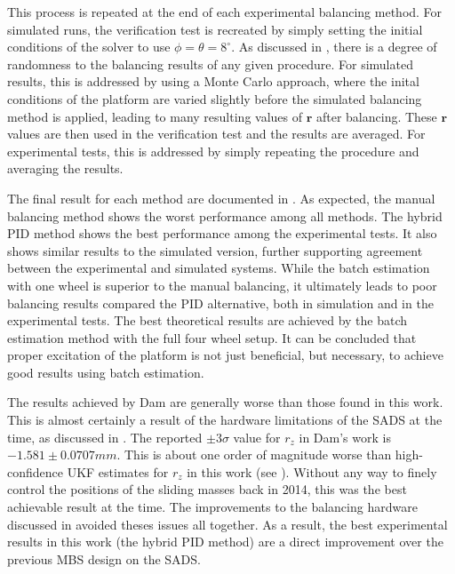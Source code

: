 This process is repeated at the end of each experimental balancing method. For simulated runs, the verification test is recreated by simply setting the initial conditions of the solver to use $\phi=\theta=8^{\circ}$. As discussed in , there is a degree of randomness to the balancing results of any given procedure. For simulated results, this is addressed by using a Monte Carlo approach, where the inital conditions of the platform are varied slightly before the simulated balancing method is applied, leading to many resulting values of $\bm{r}$ after balancing. These $\bm{r}$ values are then used in the verification test and the results are averaged. For experimental tests, this is addressed by simply repeating the procedure and averaging the results. 

The final result for each method are documented in . As expected, the manual balancing method shows the worst performance among all methods. The hybrid PID method shows the best performance among the experimental tests. It also shows similar results to the simulated version, further supporting agreement between the experimental and simulated systems. While the batch estimation with one wheel is superior to the manual balancing, it ultimately leads to poor balancing results compared the PID alternative, both in simulation and in the experimental tests. The best theoretical results are achieved by the batch estimation method with the full four wheel setup. It can be concluded that proper excitation of the platform is not just beneficial, but necessary, to achieve good results using batch estimation. 

The results achieved by Dam are generally worse than those found in this work. This is almost certainly a result of the hardware limitations of the SADS at the time, as discussed in . The reported $\pm3\sigma$ value for $r_z$ in Dam's work is $-1.581\pm0.0707mm$. This is about one order of magnitude worse than high-confidence UKF estimates for $r_z$ in this work (see ). Without any way to finely control the positions of the sliding masses back in 2014, this was the best achievable result at the time. The improvements to the balancing hardware discussed in  avoided theses issues all together. As a result, the best experimental results in this work (the hybrid PID method) are a direct improvement over the previous MBS design on the SADS.

